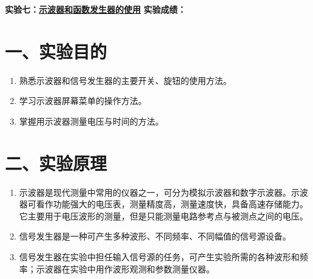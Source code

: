 \documentclass[12pt,a4paper]{article}
\begin{document}
\noindent
{\Large \textbf{实验七：}\underline{\textbf{示波器和函数发生器的使用}}} \hfill {\Large \textbf{实验成绩：}\underline{\hspace{3cm}}}
\vspace{0.5cm}

\section*{一、实验目的}
\begin{enumerate}
    \item 熟悉示波器和信号发生器的主要开关、旋钮的使用方法。
    \item 学习示波器屏幕菜单的操作方法。
    \item 掌握用示波器测量电压与时间的方法。
\end{enumerate}

\section*{二、实验原理}
\begin{enumerate}
    \item 示波器是现代测量中常用的仪器之一，可分为模拟示波器和数字示波器。示波器可看作功能强大的电压表，测量精度高，测量速度快，具备高速存储能力。它主要用于电压波形的测量，但是只能测量电路参考点与被测点之间的电压。
    \item 信号发生器是一种可产生多种波形、不同频率、不同幅值的信号源设备。
    \item 信号发生器在实验中担任输入信号源的任务，可产生实验所需的各种波形和频率；示波器在实验中用作波形观测和参数测量仪器。

\end{enumerate}
\end{document}
